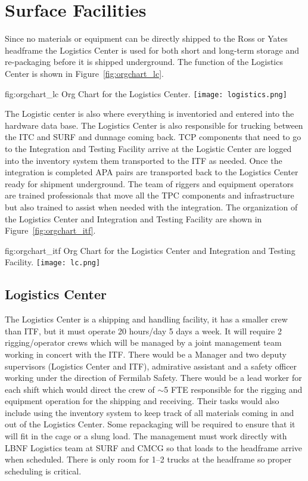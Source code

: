 \section{Surface Facilities}

Since no materials or equipment can be directly shipped to the Ross or
Yates headframe the Logistics Center is used for both short and
long-term storage and re-packaging before it is shipped underground.
The function of the Logistics Center is shown in Figure~\ref{fig:orgchart_lc}.
\begin{dunefigure}{fig:orgchart_lc}
  {Org Chart for the Logistics Center.}
  \texttt{[image: logistics.png]}
\end{dunefigure}
The Logistic center is also where everything is inventoried and
entered into the hardware data base.  The Logistics Center is also
responsible for trucking between the ITC and SURF and dunnage coming
back.  TCP components that need to go to the Integration and Testing
Facility arrive at the Logistic Center are logged into the inventory
system them transported to the ITF as needed. Once the integration is
completed APA pairs are transported back to the Logistics Center ready
for shipment underground.  The team of riggers and equipment operators
are trained professionals that move all the TPC components and
infrastructure but also trained to assist when needed with the
integration. The organization of the Logistics Center and Integration and Testing
Facility are shown in Figure~\ref{fig:orgchart_itf}.
\begin{dunefigure}{fig:orgchart_itf}
  {Org Chart for the Logistics Center and Integration and Testing Facility.}
  \texttt{[image: lc.png]}
\end{dunefigure}

\subsection{Logistics Center}

The Logistics Center is a shipping and handling facility, it has a
smaller crew than ITF, but it must operate 20 hours/day 5 days a week.
It will require 2 rigging/operator crews which will be managed by a
joint management team working in concert with the ITF.  There would be
a Manager and two deputy supervisors (Logistics Center and ITF),
admirative assistant and a safety officer working under the direction
of Fermilab Safety.  There would be a lead worker for each shift which
would direct the crew of $\sim$5 FTE responsible for the rigging and
equipment operation for the shipping and receiving.  Their tasks would
also include using the inventory system to keep track of all materials
coming in and out of the Logistics Center. Some repackaging will be
required to ensure that it will fit in the cage or a slung load.  The
management must work directly with LBNF Logistics team at SURF and
CMCG so that loads to the headframe arrive when scheduled.  There is
only room for 1--2 trucks at the headframe so proper scheduling is
critical.

